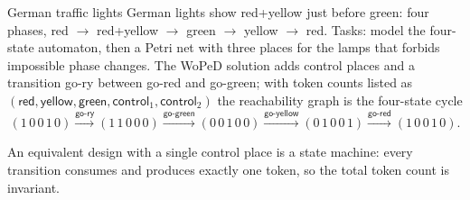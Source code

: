 \begin{examplebox}{German traffic lights}
German lights show \textsf{red+yellow} just before \textsf{green}: four phases, \textsf{red} $\to$ \textsf{red+yellow} $\to$ \textsf{green} $\to$ \textsf{yellow} $\to$ \textsf{red}. Tasks: model the four-state automaton, then a Petri net with three places for the lamps that forbids impossible phase changes. The WoPeD solution adds control places and a transition \textsf{go-ry} between \textsf{go-red} and \textsf{go-green}; with token counts listed as $(\textsf{red}, \textsf{yellow}, \textsf{green}, \textsf{control}_1, \textsf{control}_2)$ the reachability graph is the four-state cycle
\[
  (1\,0\,0\,1\,0) \xrightarrow{\textsf{go-ry}} (1\,1\,0\,0\,0) \xrightarrow{\textsf{go-green}} (0\,0\,1\,0\,0) \xrightarrow{\textsf{go-yellow}} (0\,1\,0\,0\,1) \xrightarrow{\textsf{go-red}} (1\,0\,0\,1\,0).
\]
\begin{center}
\end{center}
An equivalent design with a single control place is a state machine: every transition consumes and produces exactly one token, so the total token count is invariant.
\end{examplebox}

